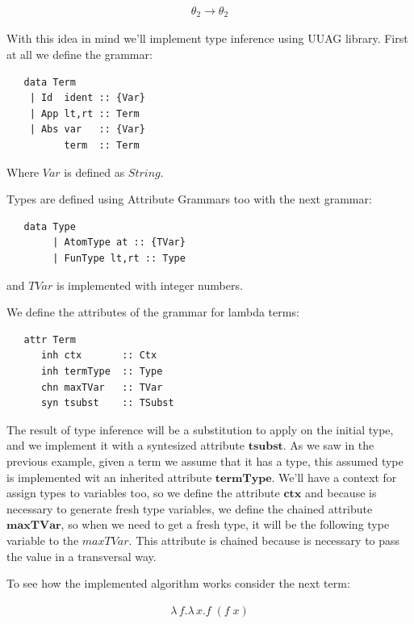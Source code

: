 \documentclass[a4paper,10pt]{article}
\begin{document}
  \begin{align*}
    {\theta_2 \rightarrow \theta_2}
  \end{align*} 
 
 \medskip
 
  With this idea in mind we'll implement type inference using UUAG library. First at all we define the grammar:
  
  \begin{lstlisting}
   data Term
	| Id  ident :: {Var}
	| App lt,rt :: Term
	| Abs var   :: {Var}
	      term  :: Term
  \end{lstlisting}

  Where $Var$ is defined as $String$.
  
  Types are defined using Attribute Grammars too with the next grammar:
  
  \begin{lstlisting}
   data Type
        | AtomType at :: {TVar}
        | FunType lt,rt :: Type
  \end{lstlisting}

  \indent and $TVar$ is implemented with integer numbers.
  \medskip
  
  We define the attributes of the grammar for lambda terms:
  
  \begin{lstlisting}
   attr Term 
      inh ctx       :: Ctx
      inh termType  :: Type
      chn maxTVar   :: TVar
      syn tsubst    :: TSubst
  \end{lstlisting}

  The result of type inference will be a substitution to apply on the initial type, and we implement it with a
  syntesized attribute $\mathbf{tsubst}$. As we saw in the previous example, given a term we assume that it has
  a type, this assumed type is implemented wit an inherited attribute $\mathbf{termType}$. We'll have a context
  for assign types to variables too, so we define the attribute $\mathbf{ctx}$ and because is necessary 
  to generate fresh type variables, we define the chained attribute $\mathbf{maxTVar}$, so when we need
  to get a fresh type, it will be the following type variable to the $maxTVar$. This attribute is chained
  because is necessary to pass the value in a transversal way.
  
  To see how the implemented algorithm works consider the next term:
  
 \begin{align*}
    \lambda\,f.\lambda\,x.f\;(f\;x)
 \end{align*}
\end{document}
